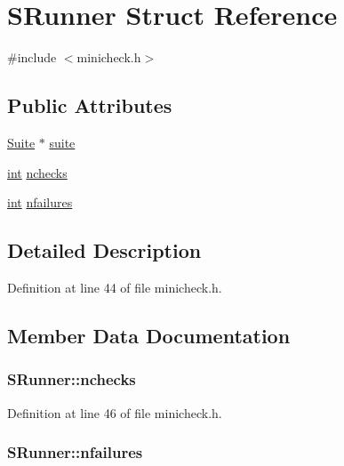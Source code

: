 \hypertarget{struct_s_runner}{}\section{S\+Runner Struct Reference}
\label{struct_s_runner}


{\ttfamily \#include $<$minicheck.\+h$>$}

\subsection*{Public Attributes}
\begin{DoxyCompactItemize}
\item 
\hyperlink{struct_suite}{Suite} $\ast$ \hyperlink{struct_s_runner_a25e6f4691d777f9b136b917f299fd6fe}{suite}
\item 
\hyperlink{xmltok_8h_a5a0d4a5641ce434f1d23533f2b2e6653}{int} \hyperlink{struct_s_runner_a0b60b601fb3ce9011b974fba73aaef75}{nchecks}
\item 
\hyperlink{xmltok_8h_a5a0d4a5641ce434f1d23533f2b2e6653}{int} \hyperlink{struct_s_runner_a944e13c4dd33236d98012ad9a3222eb2}{nfailures}
\end{DoxyCompactItemize}


\subsection{Detailed Description}


Definition at line 44 of file minicheck.\+h.



\subsection{Member Data Documentation}
\subsubsection[{\texorpdfstring{nchecks}{nchecks}}]{ S\+Runner\+::nchecks}\hypertarget{struct_s_runner_a0b60b601fb3ce9011b974fba73aaef75}{}\label{struct_s_runner_a0b60b601fb3ce9011b974fba73aaef75}


Definition at line 46 of file minicheck.\+h.

\subsubsection[{\texorpdfstring{nfailures}{nfailures}}]{ S\+Runner\+::nfailures}\hypertarget{struct_s_runner_a944e13c4dd33236d98012ad9a3222eb2}{}\label{struct_s_runner_a944e13c4dd33236d98012ad9a3222eb2}


